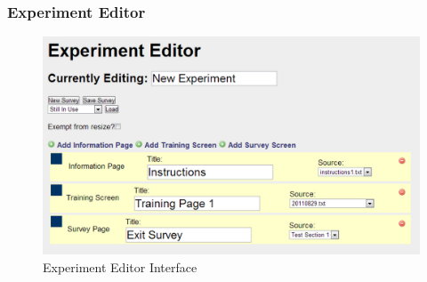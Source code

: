 \documentclass[article]{ij4uq}              %
\begin{document}


\subsubsection{Experiment Editor}

\begin{figure}[h!]
 \centering
 \includegraphics[width=5.0in]{figures/experiment_editor.png}
 \caption{Experiment Editor Interface}
 \label{fig:eeInterface}
\end{figure}
\FloatBarrier
\end{document}
